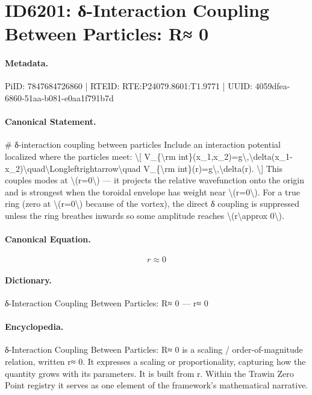 \section*{ID6201: δ-Interaction Coupling Between Particles: R≈ 0}
\paragraph{Metadata.}
PiID: 7847684726860 | RTEID: RTE:P24079.8601:T1.9771 | UUID: 4059dfea-6860-51aa-b081-e0aa1f791b7d

\paragraph{Canonical Statement.}
\# δ-interaction coupling between particles Include an interaction potential localized where the particles meet: \textbackslash{}[ V\_\{\textbackslash{}rm int\}(x\_1,x\_2)=g\textbackslash{},\textbackslash{}delta(x\_1-x\_2)\textbackslash{}quad\textbackslash{}Longleftrightarrow\textbackslash{}quad V\_\{\textbackslash{}rm int\}(r)=g\textbackslash{},\textbackslash{}delta(r). \textbackslash{}] This couples modes at \textbackslash{}(r=0\textbackslash{}) — it projects the relative wavefunction onto the origin and is strongest when the toroidal envelope has weight near \textbackslash{}(r=0\textbackslash{}). For a true ring (zero at \textbackslash{}(r=0\textbackslash{}) because of the vortex), the direct δ coupling is suppressed unless the ring breathes inwards so some amplitude reaches \textbackslash{}(r\textbackslash{}approx 0\textbackslash{}).

\paragraph{Canonical Equation.}
\[
r\approx 0
\]

\paragraph{Dictionary.}
δ-Interaction Coupling Between Particles: R≈ 0 — r≈ 0

\paragraph{Encyclopedia.}
δ-Interaction Coupling Between Particles: R≈ 0 is a scaling / order-of-magnitude relation, written r≈ 0. It expresses a scaling or proportionality, capturing how the quantity grows with its parameters. It is built from r. Within the Trawin Zero Point registry it serves as one element of the framework's mathematical narrative.
